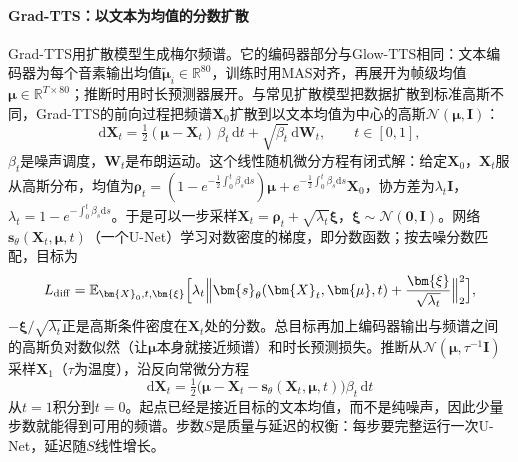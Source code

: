 \paragraph{Grad-TTS：以文本为均值的分数扩散}
Grad-TTS用扩散模型生成梅尔频谱。它的编码器部分与Glow-TTS相同：文本编码器为每个音素输出均值$\tilde{\bm{\mu}}_i\in\mathbb{R}^{80}$，训练时用MAS对齐，再展开为帧级均值$\bm{\mu}\in\mathbb{R}^{T\times80}$；推断时用时长预测器展开。与常见扩散模型把数据扩散到标准高斯不同，Grad-TTS的前向过程把频谱$\bm{X}_0$扩散到以文本均值为中心的高斯$\mathcal{N}(\bm{\mu},\bm{I})$：
\begin{equation}
  \mathrm{d}\bm{X}_t=\tfrac12(\bm{\mu}-\bm{X}_t)\,\beta_t\,\mathrm{d}t+\sqrt{\beta_t}\,\mathrm{d}\bm{W}_t,
  \qquad t\in[0,1],
  \label{eq:nlp-speech-gradtts-forward}
\end{equation}
$\beta_t$是噪声调度，$\bm{W}_t$是布朗运动。这个线性随机微分方程有闭式解：给定$\bm{X}_0$，$\bm{X}_t$服从高斯分布，均值为$\bm{\rho}_t=(1-e^{-\frac12\int_0^t\beta_s\mathrm{d}s})\bm{\mu}+e^{-\frac12\int_0^t\beta_s\mathrm{d}s}\bm{X}_0$，协方差为$\lambda_t\bm{I}$，$\lambda_t=1-e^{-\int_0^t\beta_s\mathrm{d}s}$。于是可以一步采样$\bm{X}_t=\bm{\rho}_t+\sqrt{\lambda_t}\bm{\xi}$，$\bm{\xi}\sim\mathcal{N}(\bm{0},\bm{I})$。网络$\bm{s}_\theta(\bm{X}_t,\bm{\mu},t)$（一个U-Net）学习对数密度的梯度，即分数函数；按去噪分数匹配，目标为
\begin{equation}
  L_{\mathrm{diff}}=\mathbb{E}_{\bm{X}_0,t,\bm{\xi}}\Bigl[\lambda_t\Bigl\lVert\bm{s}_\theta(\bm{X}_t,\bm{\mu},t)+\frac{\bm{\xi}}{\sqrt{\lambda_t}}\Bigr\rVert_2^2\Bigr],
  \label{eq:nlp-speech-gradtts-loss}
\end{equation}
$-\bm{\xi}/\sqrt{\lambda_t}$正是高斯条件密度在$\bm{X}_t$处的分数。总目标再加上编码器输出与频谱之间的高斯负对数似然（让$\bm{\mu}$本身就接近频谱）和时长预测损失。推断从$\mathcal{N}(\bm{\mu},\tau^{-1}\bm{I})$采样$\bm{X}_1$（$\tau$为温度），沿反向常微分方程
\[
  \mathrm{d}\bm{X}_t=\tfrac12\bigl(\bm{\mu}-\bm{X}_t-\bm{s}_\theta(\bm{X}_t,\bm{\mu},t)\bigr)\beta_t\,\mathrm{d}t
\]
从$t=1$积分到$t=0$。起点已经是接近目标的文本均值，而不是纯噪声，因此少量步数就能得到可用的频谱。步数$S$是质量与延迟的权衡：每步要完整运行一次U-Net，延迟随$S$线性增长。


